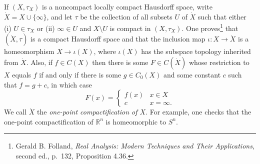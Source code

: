 \documentclass{article}
\theoremstyle{definition}
\begin{document}
If $(X,\tau_X)$ is a noncompact locally compact Hausdorff space, write $\dot{X}=X \cup \{\infty\}$, and let $\tau$ be the collection of all subsets $U$ of $\dot{X}$ such that
either (i) $U \in \tau_X$ or (ii) $\infty \in U$ and $X \setminus U$ is compact in $(X,\tau_X)$.
One proves\footnote{Gerald B. Folland,
{\em Real Analysis: Modern Techniques and Their Applications}, second ed., p.~132, Proposition 4.36.} that 
$(\dot{X},\tau)$ is a compact Hausdorff space and that the inclusion map $\iota:X \to \dot{X}$ is a homeomorphism $X \to \iota(X)$, where
$\iota(X)$ has the subspace topology inherited from $\dot{X}$. Also, if $f \in C(X)$ then there is some $F \in C(\dot{X})$ whose restriction
to $X$ equals $f$ if and only if there is some $g \in C_0(X)$ and some constant $c$ such that $f=g+c$, in which case
\[
F(x) = \begin{cases}
f(x)&x \in X\\
c&x=\infty.
\end{cases}
\]
We call $\dot{X}$ the {\em one-point compactification of $X$}. For example, one checks that the one-point compactification of $\mathbb{R}^n$ is homeomorphic
to $S^n$. 
\end{document}
